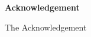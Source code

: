\begin{center}
{\LARGE\bfseries
Acknowledgement}
\end{center}

\vspace{5mm}

{\small

The Acknowledgement

}

\clearpage
